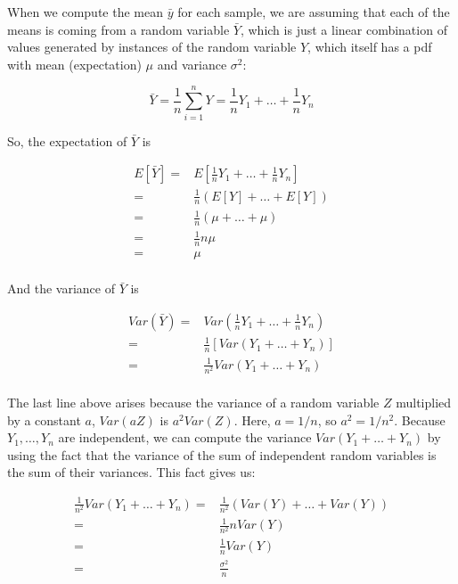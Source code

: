 \documentclass[12pt,]{krantz}
\begin{document}
When we compute the mean \(\bar{y}\) for each sample, we are assuming that each of the means is coming from a random variable \(\bar{Y}\), which is just a linear combination of values generated by instances of the random variable \(Y\), which itself has a pdf with mean (expectation) \(\mu\) and variance \(\sigma^2\):

\begin{equation}
\bar{Y}=\frac{1}{n} \sum_{i=1}^n Y = \frac{1}{n}Y_1 + \dots + \frac{1}{n}Y_n
 \end{equation}

So, the expectation of \(\bar{Y}\) is

\begin{equation}
\begin{split}
E[\bar{Y}] =& E[\frac{1}{n}Y_1 + \dots + \frac{1}{n}Y_n]\\
=& \frac{1}{n} (E[Y] + \dots + E[Y])\\
=& \frac{1}{n} (\mu + \dots + \mu)\\
=& \frac{1}{n} n\mu \\
=& \mu \\
\end{split}
\end{equation}

And the variance of \(\bar{Y}\) is

\begin{equation}
\begin{split}
Var(\bar{Y}) =& Var(\frac{1}{n}Y_1 + \dots + \frac{1}{n}
Y_n)\\
=& \frac{1}{n} [Var(Y_1 + \dots + Y_n)]\\
=& \frac{1}{n^2} Var(Y_1 + \dots + Y_n)\\
\end{split}
\end{equation}

The last line above arises because the variance of a random variable \(Z\) multiplied by a constant \(a\), \(Var(aZ)\) is \(a^2 Var(Z)\). Here, \(a=1/n\), so \(a^2 = 1/n^2\).
Because \(Y_1,\dots,Y_n\) are independent, we can compute the variance \(Var(Y_1 + \dots + Y_n)\) by using the fact that the variance of the sum of independent random variables is the sum of their variances. This fact gives us:

\begin{equation} \label{sdsmderivation}
\begin{split}
\frac{1}{n^2} Var(Y_1 + \dots + Y_n) =& \frac{1}{n^2} (Var(Y) + \dots + Var(Y))\\
=&  \frac{1}{n^2}  n Var(Y)\\
=&  \frac{1}{n}  Var(Y)\\
=&  \frac{\sigma^2}{n}\\
\end{split}
\end{equation}
\end{document}
